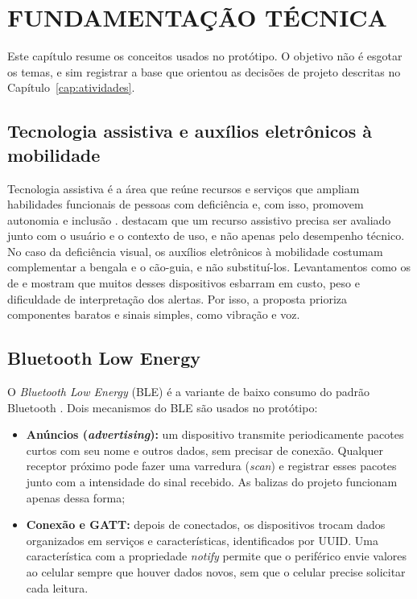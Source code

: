 \chapter{FUNDAMENTAÇÃO TÉCNICA}
\label{cap:fundamentacao}

Este capítulo resume os conceitos usados no protótipo. O objetivo não é esgotar os temas, e sim registrar a base que orientou as decisões de projeto descritas no Capítulo~\ref{cap:atividades}.

\section{Tecnologia assistiva e auxílios eletrônicos à mobilidade}
\label{sec:ta}

Tecnologia assistiva é a área que reúne recursos e serviços que ampliam habilidades funcionais de pessoas com deficiência e, com isso, promovem autonomia e inclusão \cite{bersch2017}.  destacam que um recurso assistivo precisa ser avaliado junto com o usuário e o contexto de uso, e não apenas pelo desempenho técnico. No caso da deficiência visual, os auxílios eletrônicos à mobilidade costumam complementar a bengala e o cão-guia, e não substituí-los. Levantamentos como os de  e  mostram que muitos desses dispositivos esbarram em custo, peso e dificuldade de interpretação dos alertas. Por isso, a proposta prioriza componentes baratos e sinais simples, como vibração e voz.

\section{Bluetooth Low Energy}
\label{sec:ble}

O \textit{Bluetooth Low Energy} (BLE) é a variante de baixo consumo do padrão Bluetooth \cite{bluetooth2023core}. Dois mecanismos do BLE são usados no protótipo:

\begin{itemize}
    \item \textbf{Anúncios (\textit{advertising}):} um dispositivo transmite periodicamente pacotes curtos com seu nome e outros dados, sem precisar de conexão. Qualquer receptor próximo pode fazer uma varredura (\textit{scan}) e registrar esses pacotes junto com a intensidade do sinal recebido. As balizas do projeto funcionam apenas dessa forma;
    \item \textbf{Conexão e GATT:} depois de conectados, os dispositivos trocam dados organizados em serviços e características, identificados por UUID. Uma característica com a propriedade \textit{notify} permite que o periférico envie valores ao celular sempre que houver dados novos, sem que o celular precise solicitar cada leitura.
\end{itemize}

